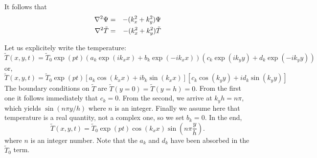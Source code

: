 It follows that
\begin{eqnarray}
\nabla^2 \Psi &=& -(k_x^2+k_y^2) \Psi \nonumber\\
\nabla^2 \tilde{T} &=& -(k_x^2+k_y^2) \tilde{T} \nonumber
\end{eqnarray}

Let us explicitely write the temperature:
\[
\tilde{T}(x,y,t) = \tilde{T}_0 \exp(pt) 
(a_k \exp(i k_x x) + b_k \exp(-i k_x x) ) 
(c_k \exp(i k_y y) + d_k \exp(-i k_y y) ) 
\]
or, 
\[
\tilde{T}(x,y,t) = \tilde{T}_0 \exp(pt) 
\left[a_k \cos(k_x x) + i b_k \sin(k_x x) \right]
\left[c_k \cos(k_y y) + i d_k \sin(k_y y) \right]
\]
The boundary conditions on $\tilde{T}$ are $\tilde{T}(y=0)=\tilde{T}(y=h)=0$.
From the first one it follows immediately that $c_k=0$. 
From the second, we arrive at $k_y h = n \pi$, which yields $\sin ( n \pi y/h)$
where $n$ is an integer.
Finally we assume here that temperature is a real quantity, not a complex one, so 
we set $b_k=0$. In the end,
\[
\tilde{T}(x,y,t) = \tilde{T}_0 \exp(pt) \cos (k_x x) \sin \left(n\pi \frac{y}{h} \right).
\]
where $n$ is an integer number.
Note that the $a_k$ and $d_k$ have been absorbed in the $\tilde{T}_0$ term. 


